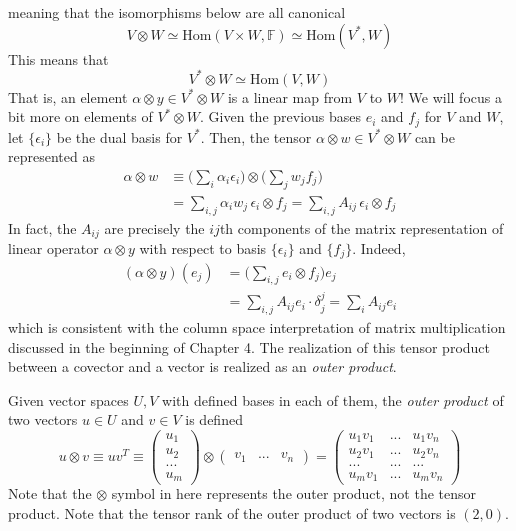 \documentclass{article}
\begin{document}
    meaning that the isomorphisms below are all canonical
    \[V \otimes W \simeq \text{Hom}(V \times W, \mathbb{F}) \simeq \text{Hom}(V^*, W)\]
    This means that
    \[V^* \otimes W \simeq \text{Hom}(V, W)\]
    That is, an element $\alpha \otimes y \in V^* \otimes W$ is a linear map from $V$ to $W$! We will focus a bit more on elements of $V^* \otimes W$. Given the previous bases $e_i$ and $f_j$ for $V$ and $W$, let $\{\epsilon_i\}$ be the dual basis for $V^*$. Then, the tensor $\alpha \otimes w \in V^* \otimes W$ can be represented as 
    \begin{align*}
        \alpha \otimes w & \equiv \bigg(\sum_i \alpha_i \epsilon_i \bigg) \otimes \bigg( \sum_j w_j f_j \bigg) \\
        & = \sum_{i, j} \alpha_i w_j \, \epsilon_i \otimes f_j = \sum_{i, j} A_{i j} \, \epsilon_i \otimes f_j
    \end{align*}
    In fact, the $A_{i j}$ are precisely the $i j$th components of the matrix representation of linear operator $\alpha \otimes y$ with respect to basis $\{\epsilon_i\}$ and $\{f_j\}$. Indeed,
    \begin{align*}
        (\alpha \otimes y)(e_j) & = \bigg( \sum_{i, j} e_i \otimes f_j \bigg) e_j \\
        & = \sum_{i, j} A_{i j} e_i \cdot \delta^j_j = \sum_{i} A_{i j} e_i
    \end{align*}
    which is consistent with the column space interpretation of matrix multiplication discussed in the beginning of Chapter 4. The realization of this tensor product between a covector and a vector is realized as an \textit{outer product}. 

    \begin{definition}
    Given vector spaces $U, V$ with defined bases in each of them, the \textit{outer product} of two vectors $u \in U$ and $v \in V$ is defined
    \[u \otimes v \equiv u v^T \equiv \begin{pmatrix}
    u_1 \\ u_2 \\ ... \\ u_m
    \end{pmatrix} \otimes \begin{pmatrix}
    v_1 & ... & v_n
    \end{pmatrix} = \begin{pmatrix}
    u_1 v_1 & ... & u_1 v_n \\
    u_2 v_1 & ... & u_2 v_n \\
    ... & ... & ... \\
    u_m v_1 & ... & u_m v_n 
    \end{pmatrix}\]
    Note that the $\otimes$ symbol in here represents the outer product, not the tensor product. Note that the tensor rank of the outer product of two vectors is $(2,0)$. 
    \end{definition}
\end{document}
